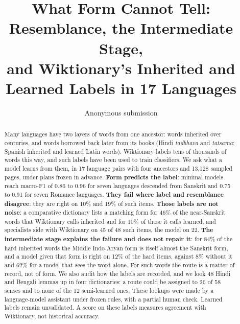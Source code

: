 \documentclass[11pt]{article}
\title{What Form Cannot Tell: Resemblance, the Intermediate Stage,\\and Wiktionary's Inherited and Learned Labels in 17 Languages}
\author{Anonymous submission}
\begin{document}
\maketitle

\begin{abstract}
Many languages have two layers of words from one ancestor: words inherited over centuries, and words borrowed back later from its books (Hindi \textit{tadbhava} and \textit{tatsama}; Spanish inherited and learned Latin words). Wiktionary labels tens of thousands of words this way, and such labels have been used to train classifiers. We ask what a model learns from them, in 17 language pairs with four ancestors and 13,128 sampled pages, under plans frozen in advance. \textbf{Form predicts the label}: minimal models reach macro-F1 of 0.86 to 0.96 for seven languages descended from Sanskrit and 0.75 to 0.91 for seven Romance languages. \textbf{They fail where label and resemblance disagree}: they are right on 10\% and 19\% of such items. \textbf{Those labels are not noise}: a comparative dictionary lists a matching form for 46\% of the near-Sanskrit words that Wiktionary calls inherited and for 10\% of those it calls learned, and specialists side with Wiktionary on 45 of 48 such items, the model on 22. \textbf{The intermediate stage explains the failure and does not repair it}: for 84\% of the hard inherited words the Middle Indo-Aryan form is itself almost the Sanskrit form, and a model given that form is right on 12\% of the hard items, against 8\% without it and 62\% for a model that sees the word alone. For such words the route is a matter of record, not of form. We also audit how the labels are recorded, and we look 48 Hindi and Bengali lemmas up in four dictionaries: a route could be assigned to 26 of 58 senses and to none of the 12 semi-learned ones. These lookups were made by a language-model assistant under frozen rules, with a partial human check. Learned labels remain unvalidated. A score on these labels measures agreement with Wiktionary, not historical accuracy.
\end{abstract}
\end{document}
